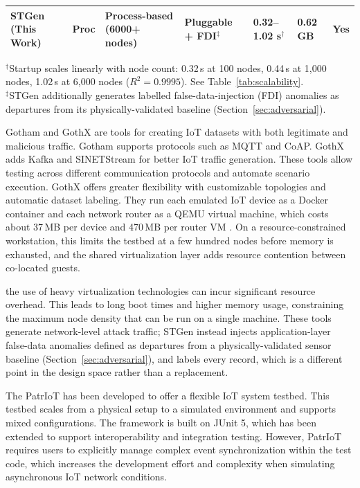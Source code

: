 \documentclass[jsan,article,submit,moreauthors,pdftex]{Definitions/mdpi}
\begin{document}
\begin{table}[ht]
\begin{tabularx}{\textwidth}{l l L L l l l}
\hline
\textbf{STGen (This Work)} & \textbf{Proc} & \textbf{Process-based (6000+ nodes)} & \textbf{Pluggable + FDI}$^{\ddagger}$ & \textbf{0.32--1.02 s}$^\dagger$ & \textbf{0.62 GB} & \textbf{Yes} \\
\hline
\end{tabularx}
\vspace{2pt}
\raggedright \footnotesize{$^\dagger$Startup scales linearly with node count: 0.32\,s at 100 nodes, 0.44\,s at 1{,}000 nodes, 1.02\,s at 6{,}000 nodes ($R^2=0.9995$). See Table~\ref{tab:scalability}.\\
$^{\ddagger}$STGen additionally generates labelled false-data-injection (FDI) anomalies as departures from its physically-validated baseline (Section~\ref{sec:adversarial}).}
\end{table}
Gotham \cite{saez2023gotham} and GothX \cite{poisson2024gothx} are tools for creating {IoT} datasets with both legitimate and malicious traffic. Gotham supports protocols such as MQTT and CoAP. GothX adds Kafka and SINETStream for better {IoT} traffic generation. These tools allow testing across different communication protocols and automate scenario execution. GothX offers greater flexibility with customizable topologies and automatic dataset labeling. They run each emulated IoT device as a Docker container and each network router as a QEMU virtual machine, which costs about 37\,MB per device and 470\,MB per router VM \cite{poisson2024gothx}. On a resource-constrained workstation, this limits the testbed at a few hundred nodes before memory is exhausted, and the shared virtualization layer adds resource contention between co-located guests.

the use of heavy virtualization technologies can incur significant resource overhead. This leads to long boot times and higher memory usage, constraining the maximum node density that can be run on a single machine. These tools generate network-level attack traffic; STGen instead injects application-layer false-data anomalies defined as departures from a physically-validated sensor baseline (Section~\ref{sec:adversarial}), and labels every record, which is a different point in the design space rather than a replacement.

The Patr{IoT} \cite{bures2021patriot} has been developed to offer a flexible {IoT} system testbed. This testbed scales from a physical setup to a simulated environment and supports mixed configurations. The framework is built on JUnit 5, which has been extended to support interoperability and integration testing. However, Patr{IoT} requires users to explicitly manage complex event synchronization within the test code, which increases the development effort and complexity when simulating asynchronous {IoT} network conditions.
\end{document}
